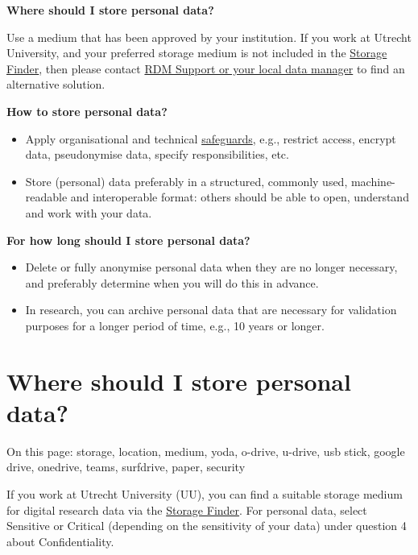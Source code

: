\documentclass[
]{book}
\providecommand{\tightlist}{%
  \setlength{\itemsep}{0pt}\setlength{\parskip}{0pt}}
\begin{document}
\textbf{Where should I store personal data?}

Use a medium that has been approved by your institution. If you work at Utrecht
University, and your preferred storage medium is not included in the
\href{https://tools.uu.nl/storagefinder/}{Storage Finder},
then please contact \protect\hyperlink{support}{RDM Support or your local data manager} to find
an alternative solution.

\textbf{How to store personal data?}

\begin{itemize}
\tightlist
\item
  Apply organisational and technical \protect\hyperlink{privacy-by-design}{safeguards},
  e.g., restrict access, encrypt data, pseudonymise data, specify responsibilities, etc.
\item
  Store (personal) data preferably in a structured, commonly used, machine-readable
  and interoperable format: others should be able to open, understand and work
  with your data.
\end{itemize}

\textbf{For how long should I store personal data?}

\begin{itemize}
\tightlist
\item
  Delete or fully anonymise personal data when they are no longer necessary,
  and preferably determine when you will do this in advance.
\item
  In research, you can archive personal data that are necessary for validation
  purposes for a longer period of time, e.g., 10 years or longer.
\end{itemize}

\hypertarget{data-storage-where}{%
\section{Where should I store personal data?}\label{data-storage-where}}

On this page: storage, location, medium, yoda, o-drive, u-drive, usb stick,
google drive, onedrive, teams, surfdrive, paper, security

If you work at Utrecht University (UU), you can find a suitable storage medium for
digital research data via the
\href{https://tools.uu.nl/storagefinder/}{Storage Finder}. For
personal data, select Sensitive or Critical (depending on the sensitivity of
your data) under question 4 about Confidentiality.
\end{document}
